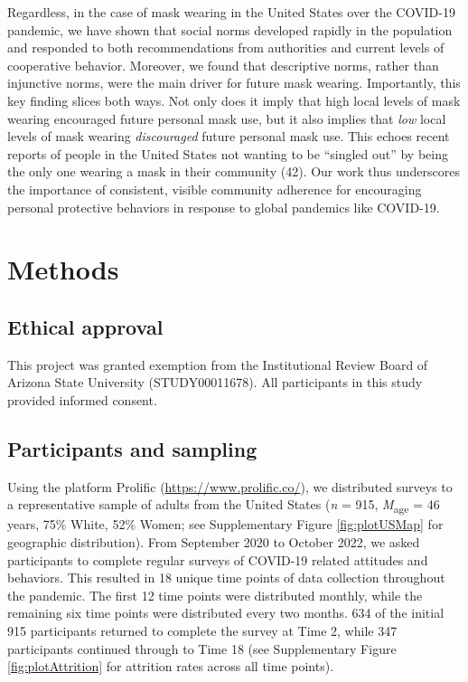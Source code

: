 \documentclass[
  man,floatsintext]{apa6}
\begin{document}
Regardless, in the case of mask wearing in the United States over the COVID-19 pandemic, we have shown that social norms developed rapidly in the population and responded to both recommendations from authorities and current levels of cooperative behavior. Moreover, we found that descriptive norms, rather than injunctive norms, were the main driver for future mask wearing. Importantly, this key finding slices both ways. Not only does it imply that high local levels of mask wearing encouraged future personal mask use, but it also implies that \emph{low} local levels of mask wearing \emph{discouraged} future personal mask use. This echoes recent reports of people in the United States not wanting to be ``singled out'' by being the only one wearing a mask in their community (42). Our work thus underscores the importance of consistent, visible community adherence for encouraging personal protective behaviors in response to global pandemics like COVID-19.

\hypertarget{methods}{%
\section{Methods}\label{methods}}

\hypertarget{ethical-approval}{%
\subsection{Ethical approval}\label{ethical-approval}}

This project was granted exemption from the Institutional Review Board of Arizona State University (STUDY00011678). All participants in this study provided informed consent.

\hypertarget{participants-and-sampling}{%
\subsection{Participants and sampling}\label{participants-and-sampling}}

Using the platform Prolific (\url{https://www.prolific.co/}), we distributed surveys to a representative sample of adults from the United States (\emph{n} = 915, \emph{M}\textsubscript{age} = 46 years, 75\% White, 52\% Women; see Supplementary Figure \ref{fig:plotUSMap} for geographic distribution). From September 2020 to October 2022, we asked participants to complete regular surveys of COVID-19 related attitudes and behaviors. This resulted in 18 unique time points of data collection throughout the pandemic. The first 12 time points were distributed monthly, while the remaining six time points were distributed every two months. 634 of the initial 915 participants returned to complete the survey at Time 2, while 347 participants continued through to Time 18 (see Supplementary Figure \ref{fig:plotAttrition} for attrition rates across all time points).
\end{document}
